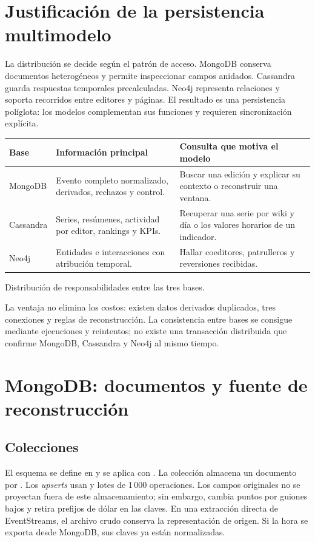 \section{Justificación de la persistencia multimodelo}
La distribución se decide según el patrón de acceso. MongoDB conserva documentos heterogéneos y permite inspeccionar campos anidados. Cassandra guarda respuestas temporales precalculadas. Neo4j representa relaciones y soporta recorridos entre editores y páginas. El resultado es una persistencia políglota: los modelos complementan sus funciones y requieren sincronización explícita.

\begin{tabla}
\begin{tabularx}{\textwidth}{P{2.3cm}YY}
\toprule
Base & Información principal & Consulta que motiva el modelo \\
\midrule
MongoDB & Evento completo normalizado, derivados, rechazos y control. & Buscar una edición y explicar su contexto o reconstruir una ventana. \\
Cassandra & Series, resúmenes, actividad por editor, rankings y KPIs. & Recuperar una serie por wiki y día o los valores horarios de un indicador. \\
Neo4j & Entidades e interacciones con atribución temporal. & Hallar coeditores, patrulleros y reversiones recibidas. \\
\bottomrule
\end{tabularx}
\caption{Distribución de responsabilidades entre las tres bases.}
\end{tabla}

La ventaja no elimina los costos: existen datos derivados duplicados, tres conexiones y reglas de reconstrucción. La consistencia entre bases se consigue mediante ejecuciones y reintentos; no existe una transacción distribuida que confirme MongoDB, Cassandra y Neo4j al mismo tiempo.

\section{MongoDB: documentos y fuente de reconstrucción}
\subsection{Colecciones}
El esquema se define en  y se aplica con . La colección  almacena un documento por . Los \textit{upserts} usan  y lotes de 1\,000 operaciones. Los campos originales no se proyectan fuera de este almacenamiento; sin embargo,  cambia puntos por guiones bajos y retira prefijos de dólar en las claves. En una extracción directa de EventStreams, el archivo crudo conserva la representación de origen. Si la hora se exporta desde MongoDB, sus claves ya están normalizadas.

